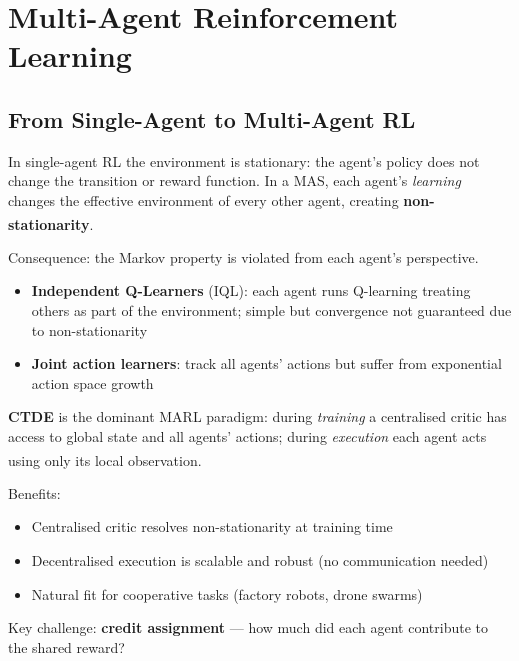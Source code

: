\section{Multi-Agent Reinforcement Learning}

\subsection{From Single-Agent to Multi-Agent RL}
\begin{tcbitemize}[ skin=sectionraster ]

    \tcbitem[title=The Non-Stationarity Problem, raster multicolumn=3]
    In single-agent RL the environment is stationary: the agent's policy
    does not change the transition or reward function.
    In a MAS, each agent's \emph{learning} changes the effective environment
    of every other agent, creating
    \textbf{non-stationarity}.\textsuperscript{\cite[][Ch.~17]{suttonReinforcementLearningIntroduction2018}}

    Consequence: the Markov property is violated from each agent's perspective.
    \begin{itemize}
        \item \textbf{Independent Q-Learners} (IQL): each agent runs Q-learning
              treating others as part of the environment; simple but convergence
              not guaranteed due to non-stationarity
        \item \textbf{Joint action learners}: track all agents' actions but suffer
              from exponential action space growth
    \end{itemize}

    \tcbitem[title={Centralised Training, Decentralised Execution (CTDE)}, raster multicolumn=3]
    \textbf{CTDE} is the dominant MARL paradigm:
    during \emph{training} a centralised critic has access to global state and
    all agents' actions; during \emph{execution} each agent acts using only
    its local observation.\textsuperscript{\cite[][p.~450]{weissMultiagentSystems2013}}

    Benefits:
    \begin{itemize}
        \item Centralised critic resolves non-stationarity at training time
        \item Decentralised execution is scalable and robust (no communication needed)
        \item Natural fit for cooperative tasks (factory robots, drone swarms)
    \end{itemize}
    Key challenge: \textbf{credit assignment} --- how much did each agent
    contribute to the shared reward?

\end{tcbitemize}

